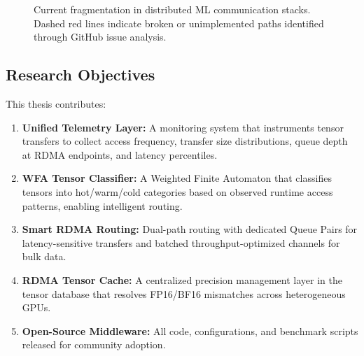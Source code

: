 \documentclass[11pt,letterpaper]{article}
\theoremstyle{definition}
\begin{document}
\begin{figure}[htbp]
{%
}
\caption{Current fragmentation in distributed ML communication stacks. Dashed red lines indicate broken or unimplemented paths identified through GitHub issue analysis.}
\label{fig:fragmentation-overview}
\end{figure}

\subsection{Research Objectives}

This thesis contributes:

\begin{enumerate}[label=\textbf{C\arabic*.}]
    \item \textbf{Unified Telemetry Layer:} A monitoring system that instruments tensor transfers to collect access frequency, transfer size distributions, queue depth at RDMA endpoints, and latency percentiles.
    \item \textbf{WFA Tensor Classifier:} A Weighted Finite Automaton that classifies tensors into hot/warm/cold categories based on observed runtime access patterns, enabling intelligent routing.
    \item \textbf{Smart RDMA Routing:} Dual-path routing with dedicated Queue Pairs for latency-sensitive transfers and batched throughput-optimized channels for bulk data.
    \item \textbf{RDMA Tensor Cache:} A centralized precision management layer in the tensor database that resolves FP16/BF16 mismatches across heterogeneous GPUs.
    \item \textbf{Open-Source Middleware:} All code, configurations, and benchmark scripts released for community adoption.
\end{enumerate}
\end{document}
